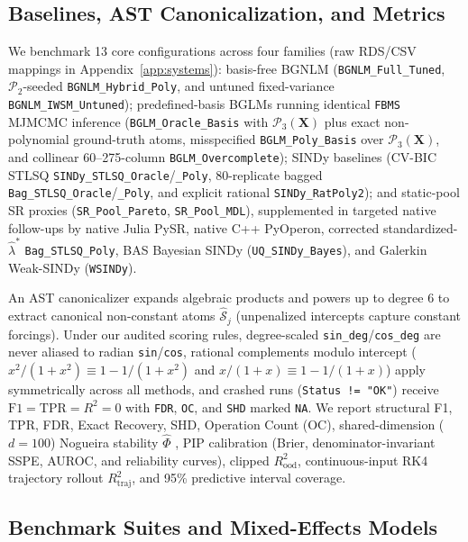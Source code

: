 \documentclass{article}
\begin{document}
\subsection{Baselines, AST Canonicalization, and Metrics}

We benchmark 13 core configurations across four families (raw RDS/CSV mappings in Appendix~\ref{app:systems}): basis-free BGNLM (\texttt{BGNLM\_Full\_Tuned}, $\mathcal{P}_2$-seeded \texttt{BGNLM\_Hybrid\_Poly}, and untuned fixed-variance \texttt{BGNLM\_IWSM\_Untuned}); predefined-basis BGLMs running identical \texttt{FBMS} MJMCMC inference (\texttt{BGLM\_Oracle\_Basis} with $\mathcal{P}_3(\boldsymbol{X})$ plus exact non-polynomial ground-truth atoms, misspecified \texttt{BGLM\_Poly\_Basis} over $\mathcal{P}_3(\boldsymbol{X})$, and collinear 60--275-column \texttt{BGLM\_Overcomplete}); SINDy baselines (CV-BIC STLSQ \texttt{SINDy\_STLSQ\_Oracle}/\texttt{\_Poly}, 80-replicate bagged \texttt{Bag\_STLSQ\_Oracle}/\texttt{\_Poly}, and explicit rational \texttt{SINDy\_RatPoly2}); and static-pool SR proxies (\texttt{SR\_Pool\_Pareto}, \texttt{SR\_Pool\_MDL}), supplemented in targeted native follow-ups by native Julia PySR, native C++ PyOperon, corrected standardized-$\hat{\lambda}^*$ \texttt{Bag\_STLSQ\_Poly}, BAS Bayesian SINDy (\texttt{UQ\_SINDy\_Bayes}), and Galerkin Weak-SINDy (\texttt{WSINDy}).

An AST canonicalizer expands algebraic products and powers up to degree 6 to extract canonical non-constant atoms $\hat{\mathcal{S}}_j$ (unpenalized intercepts capture constant forcings). Under our audited scoring rules, degree-scaled \texttt{sin\_deg}/\texttt{cos\_deg} are never aliased to radian \texttt{sin}/\texttt{cos}, rational complements modulo intercept ($x^2/(1+x^2) \equiv 1 - 1/(1+x^2)$ and $x/(1+x) \equiv 1 - 1/(1+x)$) apply symmetrically across all methods, and crashed runs (\texttt{Status != "OK"}) receive $\text{F1}=\text{TPR}=R^2=0$ with \texttt{FDR}, \texttt{OC}, and \texttt{SHD} marked \texttt{NA}. We report structural F1, TPR, FDR, Exact Recovery, SHD, Operation Count (OC), shared-dimension ($d=100$) Nogueira stability $\hat{\Phi}$ \citep{nogueira2018stability}, PIP calibration (Brier, denominator-invariant SSPE, AUROC, and reliability curves), clipped $R^2_{\text{ood}}$, continuous-input RK4 trajectory rollout $R^2_{\text{traj}}$, and 95\% predictive interval coverage.

\subsection{Benchmark Suites and Mixed-Effects Models}
\end{document}
